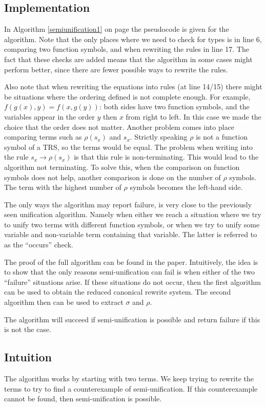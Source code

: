 \subsection{Implementation}
In Algorithm \ref{semiunification1} on page \pageref{semiunification1} the pseudocode is given for the algorithm. Note that the only places where we need to check for types is in line 6, comparing two function symbols, and when rewriting the rules in line 17. The fact that these checks are added means that the algorithm in some cases might perform better, since there are fewer possible ways to rewrite the rules.

Also note that when rewriting the equations into rules (at line 14/15) there might be situations where the ordering defined is not complete enough. For example, $f(g(x), y) = f(x, g(y))$: both sides have two function symbols, and the variables appear in the order $y$ then $x$ from right to left. In this case we made the choice that the order does not matter. Another problem comes into place comparing terms such as $\rho(s_x)$ and $s_x$. Strictly speaking $\rho$ is not a function symbol of a TRS, so the terms would be equal. The problem when writing into the rule $s_x \rightarrow \rho(s_x)$ is that this rule is non-terminating. This would lead to the algorithm not terminating. To solve this, when the comparison on function symbols does not help, another comparison is done on the number of $\rho$ symbols. The term with the highest number of $\rho$ symbols becomes the left-hand side.

The only ways the algorithm may report failure, is very close to the previously seen unification algorithm. Namely when either we reach a situation where we try to unify two terms with different function symbols, or when we try to unify some variable and non-variable term containing that variable. The latter is referred to as the ``occurs'' check. 

The proof of the full algorithm can be found in the paper\cite{SemiUnification}. Intuitively, the idea is to show that the only reasons semi-unification can fail is when either of the two ``failure'' situations arise. If these situations do not occur, then the first algorithm can be used to obtain the reduced canonical rewrite system. The second algorithm then can be used to extract $\sigma$ and $\rho$.  

The algorithm will succeed if semi-unification is possible and return failure if this is not the case. 

\subsection{Intuition}
The algorithm works by starting with two terms. We keep trying to rewrite the terms to try to find a counterexample of semi-unification. If this counterexample cannot be found, then semi-unification is possible. 

